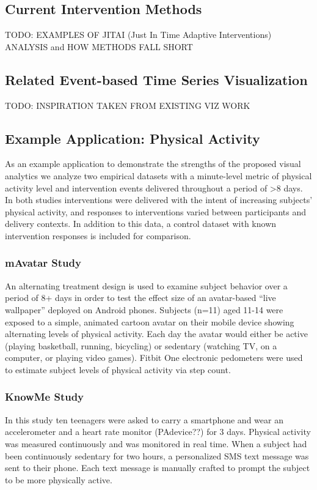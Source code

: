 \documentclass[preprint,journal]{vgtc}       %
\begin{document}
\subsection{Current Intervention Methods}
TODO: EXAMPLES OF JITAI (Just In Time Adaptive Interventions) ANALYSIS and HOW METHODS FALL SHORT

\subsection{Related Event-based Time Series Visualization}
TODO: INSPIRATION TAKEN FROM EXISTING VIZ WORK


\subsection{Example Application: Physical Activity}
As an example application to demonstrate the strengths of the proposed visual analytics we analyze two empirical datasets with a minute-level metric of physical activity level and intervention events delivered throughout a period of >8 days. 
In both studies interventions were delivered with the intent of increasing subjects’ physical activity, and responses to interventions varied between participants and delivery contexts. 
In addition to this data, a control dataset with known intervention responses is included for comparison.

\subsubsection{mAvatar Study}
An alternating treatment design is used to examine subject behavior over a period of 8+ days in order to test the effect size of an avatar-based “live wallpaper” deployed on Android phones. 
Subjects (n=11) aged 11-14 were exposed to a simple, animated cartoon avatar on their mobile device showing alternating levels of physical activity. 
Each day the avatar would either be active (playing basketball, running, bicycling) or sedentary (watching TV, on a computer, or playing video games). 
Fitbit One electronic pedometers were used to estimate subject levels of physical activity via step count. 

\subsubsection{KnowMe Study}
In this study ten teenagers were asked to carry a smartphone and wear an accelerometer and a heart rate monitor (PAdevice??) for 3 days. 
Physical activity was measured continuously and was monitored in real time. 
When a subject had been continuously sedentary for two hours, a personalized SMS text message was sent to their phone. 
Each text message is manually crafted to prompt the subject to be more physically active.
\end{document}
